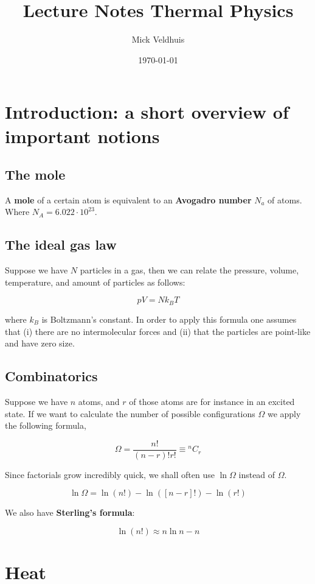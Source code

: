 \documentclass[a4paper]{article}
\title{Lecture Notes Thermal Physics}
\author{Mick Veldhuis}
\date{\today}
\begin{document}
\maketitle

\tableofcontents

\section{Introduction: a short overview of important notions}

\subsection*{The mole}

A \textbf{mole} of a certain atom is equivalent to an \textbf{Avogadro number} $N_a$ of atoms. Where $N_A=6.022\cdot 10^23$.

\subsection*{The ideal gas law}

Suppose we have $N$ particles in a gas, then we can relate the pressure, volume, temperature, and amount of particles as follows:

\begin{equation}
	pV=Nk_BT
\end{equation}

where $k_B$ is Boltzmann's constant. In order to apply this formula one assumes that (i) there are no intermolecular forces and (ii) that the particles are point-like and have zero size. 

\subsection*{Combinatorics}

Suppose we have $n$ atoms, and $r$ of those atoms are for instance in an excited state. If we want to calculate the number of possible configurations $\Omega$ we apply the following formula,

\begin{equation}
	\Omega=\frac{n!}{(n-r)!r!}\equiv {}^nC_r
\end{equation}

Since factorials grow incredibly quick, we shall often use $\ln\Omega$ instead of $\Omega$. 

\begin{equation}
	\ln\Omega=\ln(n!)-\ln([n-r]!)-\ln(r!)
\end{equation}

We also have \textbf{Sterling's formula}:

\begin{equation}
	\ln(n!)\approx n\ln n-n
\end{equation}

\section{Heat}
\end{document}
